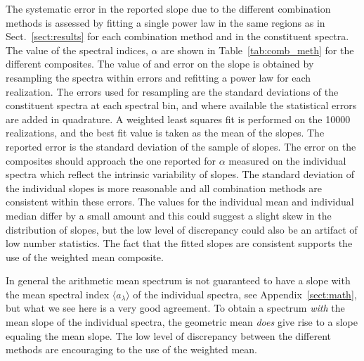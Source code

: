 \documentclass{aa}    %
\newcommand{\Tab}[1]{Table~\ref{tab:#1}}
\newcommand{\tab}[1]{\Tab{#1}}
\newcommand{\sectionname}{Sect.}
\newcommand{\Sect}[1]{\sectionname~\ref{sect:#1}}
\newcommand{\sect}[1]{\Sect{#1}}
\newcommand{\App}[1]{Appendix~\ref{sect:#1}}
\newcommand{\app}[1]{\App{#1}}
\begin{document}
 The systematic error in the reported
slope due to the different combination methods is assessed by fitting
a single power law in the same regions as in \sect{results} for each
combination method and in the constituent spectra. The value of the
spectral indices, $\alpha$ are shown in \tab{comb_meth} for the
different composites.  The value of and error on the slope is obtained
by resampling the spectra within errors and refitting a power law for
each realization. The errors used for resampling are the standard
deviations of the constituent spectra at each spectral bin, and where
available the statistical errors are added in quadrature.
 A weighted least squares fit is performed on the 10000 realizations,
 and the best fit value is taken as the mean of the slopes. The
 reported error is the standard deviation of the sample of slopes.
 The error on the composites should approach the one reported for
 $\alpha$ measured on the individual spectra which reflect the
 intrinsic variability of slopes. The standard deviation of the
 individual slopes is more reasonable and all combination methods are
 consistent within these errors. The values for the individual mean
 and individual median differ by a small amount and this could suggest
 a slight skew in the distribution of slopes, but the low level of
 discrepancy could also be an artifact of low number statistics. The
 fact that the fitted slopes are consistent supports the use of the
 weighted mean composite.

In general the arithmetic mean spectrum is not guaranteed to have a
slope with the mean spectral index $\langle a_\lambda\rangle$ of the
individual spectra, see \app{math}, but what we see here is a very
good agreement. To obtain a spectrum \textit{with} the mean slope of
the individual spectra, the geometric mean \textit{does} give rise to
a slope equaling the mean slope. The low level of discrepancy between
the different methods are encouraging to the use of the weighted mean.

\end{document}
